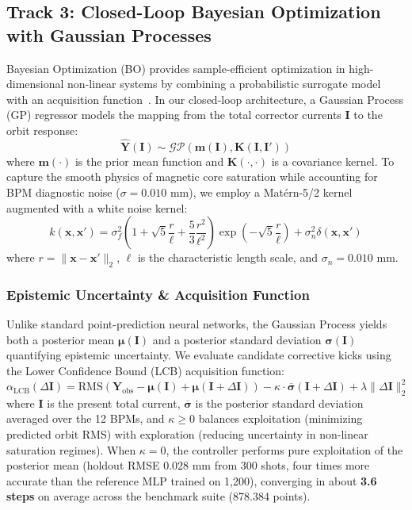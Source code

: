\documentclass[11pt,a4paper]{article}
\begin{document}
\subsection{Track 3: Closed-Loop Bayesian Optimization with Gaussian Processes}
Bayesian Optimization (BO) provides sample-efficient optimization in high-dimensional non-linear systems by combining a probabilistic surrogate model with an acquisition function~\cite{roussel2023turnkey, edelen2020machine}. In our closed-loop architecture, a Gaussian Process (GP) regressor models the mapping from the total corrector currents $\mathbf{I}$ to the orbit response:
\begin{equation}
    \hat{\mathbf{Y}}(\mathbf{I}) \sim \mathcal{GP}\left(\mathbf{m}(\mathbf{I}), \mathbf{K}(\mathbf{I}, \mathbf{I}')\right)
\end{equation}
where $\mathbf{m}(\cdot)$ is the prior mean function and $\mathbf{K}(\cdot, \cdot)$ is a covariance kernel. To capture the smooth physics of magnetic core saturation while accounting for BPM diagnostic noise ($\sigma = 0.010\text{ mm}$), we employ a Mat\'ern-5/2 kernel augmented with a white noise kernel:
\begin{equation}
    k(\mathbf{x}, \mathbf{x}') = \sigma_f^2 \left( 1 + \sqrt{5}\frac{r}{\ell} + \frac{5}{3}\frac{r^2}{\ell^2} \right) \exp\left( -\sqrt{5}\frac{r}{\ell} \right) + \sigma_n^2 \delta(\mathbf{x}, \mathbf{x}')
\end{equation}
where $r = \|\mathbf{x} - \mathbf{x}'\|_2$, $\ell$ is the characteristic length scale, and $\sigma_n = 0.010\text{ mm}$.

\subsubsection{Epistemic Uncertainty \& Acquisition Function}
Unlike standard point-prediction neural networks, the Gaussian Process yields both a posterior mean $\boldsymbol{\mu}(\mathbf{I})$ and a posterior standard deviation $\boldsymbol{\sigma}(\mathbf{I})$ quantifying epistemic uncertainty.
We evaluate candidate corrective kicks using the Lower Confidence Bound (LCB) acquisition function:
\begin{equation}
    \alpha_{\text{LCB}}(\Delta \mathbf{I}) = \text{RMS}\left( \mathbf{Y}_{\text{obs}} - \boldsymbol{\mu}(\mathbf{I}) + \boldsymbol{\mu}(\mathbf{I} + \Delta \mathbf{I}) \right) - \kappa \cdot \overline{\boldsymbol{\sigma}}(\mathbf{I} + \Delta \mathbf{I}) + \lambda \|\Delta \mathbf{I}\|_2^2
\end{equation}
where $\mathbf{I}$ is the present total current, $\overline{\boldsymbol{\sigma}}$ is the posterior standard deviation averaged over the 12 BPMs, and $\kappa \ge 0$ balances exploitation (minimizing predicted orbit RMS) with exploration (reducing uncertainty in non-linear saturation regimes). When $\kappa = 0$, the controller performs pure exploitation of the posterior mean (holdout RMSE $0.028\text{ mm}$ from 300 shots, four times more accurate than the reference MLP trained on 1,200), converging in about \textbf{3.6 steps} on average across the benchmark suite (878.384 points).
\end{document}
